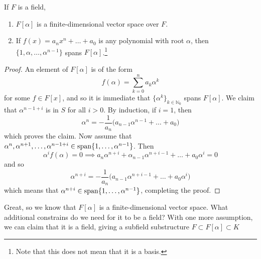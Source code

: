   \begin{lemma}
    If $F$ is a field, 
    \begin{enumerate}
      \item $F[\alpha]$ is a finite-dimensional vector space over $F$. 
      \item If $f(x) = a_n x^n + \ldots + a_0$ is any polynomial with root $\alpha$, then $\{1, \alpha, \ldots, \alpha^{n-1}\}$ spans $F[\alpha]$.\footnote{Note that this does not mean that it is a basis.} 
    \end{enumerate}
  \end{lemma}
  \begin{proof}
    An element of $F[\alpha]$ is of the form 
    \begin{equation}
      f(\alpha) = \sum_{k=0}^n a_k \alpha^k
    \end{equation} 
    for some $f \in F[x]$, and so it is immediate that $\{\alpha^k\}_{k \in \mathbb{N}_0}$ spans $F[\alpha]$. We claim that $\alpha^{n-1+i}$ is in $S$ for all $i > 0$. By induction, if $i = 1$, then 
    \begin{equation}
      \alpha^n = -\frac{1}{a_n} \big( a_{n-1} \alpha^{n-1} + \ldots + a_0 \big)
    \end{equation}
    which proves the claim. Now assume that $\alpha^n, \alpha^{n+1}, \ldots, \alpha^{n-1+i} \in \operatorname{span}\{1, \ldots, \alpha^{n-1}\}$. Then 
    \begin{equation}
      \alpha^i f(\alpha) = 0 \implies a_n \alpha^{n+i} + \alpha_{n-1} \alpha^{n+i-1} + \ldots + a_0 \alpha^i = 0 
    \end{equation}
    and so 
    \begin{equation}
      \alpha^{n+i} = -\frac{1}{a_n} \big(a_{n-1} \alpha^{n+i-1} + \ldots + a_0 \alpha^i)
    \end{equation}
    which means that $\alpha^{n+i} \in \operatorname{span}\{1, \ldots, \alpha^{n-1}\}$, completing the proof. 
  \end{proof} 

  Great, so we know that $F[\alpha]$ is a finite-dimensional vector space. What additional constrains do we need for it to be a field? With one more assumption, we can claim that it is a field, giving a subfield substructure $F \subset F[\alpha] \subset K$

